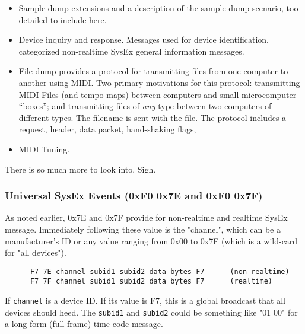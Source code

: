    \begin{itemize}
      \item Sample dump extensions and a description of the sample dump
         scenario, too detailed to include here.
      \item Device inquiry and response.
         Messages used for device identification, categorized non-realtime
         SysEx general information messages.
      \item File dump provides a protocol for transmitting files from one
         computer to another using MIDI.
         Two primary motivations for this protocol: transmitting MIDI Files
         (and tempo maps) between computers and small microcomputer “boxes”;
         and transmitting files of \textsl{any} type between two computers
         of different types. The filename is sent with the file.
         The protocol includes a request, header, data packet, hand-shaking
         flags,
      \item MIDI Tuning.
   \end{itemize}

   There is so much more to look into.  Sigh.

\subsubsection{Universal SysEx Events (0xF0 0x7E and 0xF0 0x7F)}
\label{subsubsec:midi_meta_universalsysex_event}

   As noted earlier, 0x7E and 0x7F provide for non-realtime and realtime SysEx
   message.
   Immediately following these value is the "channel", which can be a
   manufacturer's ID or any value ranging from 0x00 to 0x7F (which is a
   wild-card for "all devices").

   \begin{verbatim}
      F7 7E channel subid1 subid2 data bytes F7      (non-realtime)
      F7 7F channel subid1 subid2 data bytes F7      (realtime)
   \end{verbatim}

   If \texttt{channel} is a device ID.
   If its value is F7, this is a global broadcast that all devices
   should heed.
   The \texttt{subid1} and \texttt{subid2}
   could be something like "01 00" for a long-form
   (full frame) time-code message.


